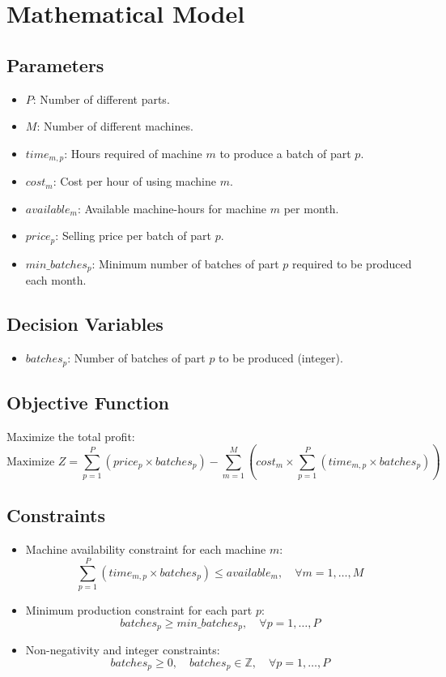 \documentclass{article}
\begin{document}
\section*{Mathematical Model}

\subsection*{Parameters}
\begin{itemize}
    \item $P$: Number of different parts.
    \item $M$: Number of different machines.
    \item $time_{m,p}$: Hours required of machine $m$ to produce a batch of part $p$.
    \item $cost_{m}$: Cost per hour of using machine $m$.
    \item $available_{m}$: Available machine-hours for machine $m$ per month.
    \item $price_{p}$: Selling price per batch of part $p$.
    \item $min\_batches_{p}$: Minimum number of batches of part $p$ required to be produced each month.
\end{itemize}

\subsection*{Decision Variables}
\begin{itemize}
    \item $batches_{p}$: Number of batches of part $p$ to be produced (integer).
\end{itemize}

\subsection*{Objective Function}
Maximize the total profit:
\[
\text{Maximize } Z = \sum_{p=1}^{P} \left( price_{p} \times batches_{p} \right) - \sum_{m=1}^{M} \left( cost_{m} \times \sum_{p=1}^{P} \left( time_{m,p} \times batches_{p} \right) \right)
\]

\subsection*{Constraints}
\begin{itemize}
    \item Machine availability constraint for each machine $m$:
    \[
    \sum_{p=1}^{P} \left( time_{m,p} \times batches_{p} \right) \leq available_{m}, \quad \forall m = 1, \ldots, M
    \]
    \item Minimum production constraint for each part $p$:
    \[
    batches_{p} \geq min\_batches_{p}, \quad \forall p = 1, \ldots, P
    \]
    \item Non-negativity and integer constraints:
    \[
    batches_{p} \geq 0, \quad batches_{p} \in \mathbb{Z}, \quad \forall p = 1, \ldots, P
    \]
\end{itemize}
\end{document}
